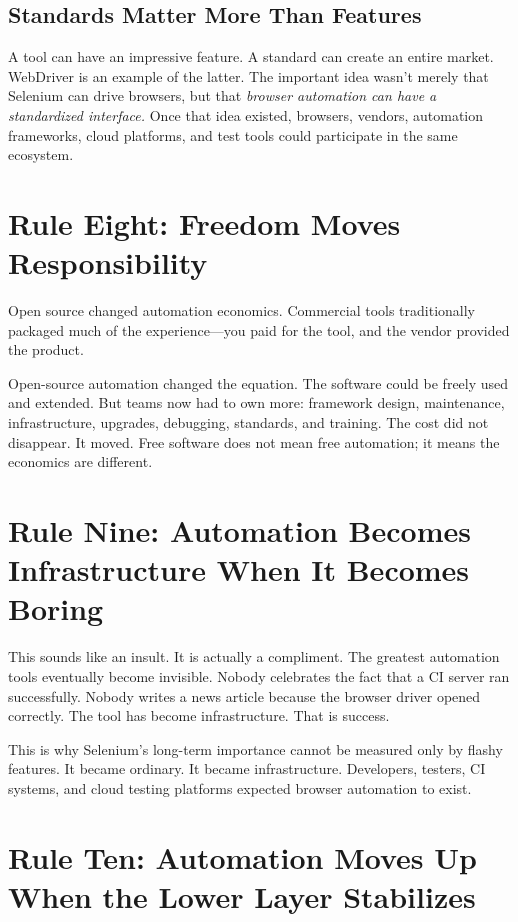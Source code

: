 \documentclass[11pt,twoside]{book}
\begin{document}
\subsection*{Standards Matter More Than Features}

A tool can have an impressive feature. A standard can create an entire market. WebDriver is an example of the latter. The important idea wasn't merely that Selenium can drive browsers, but that \emph{browser automation can have a standardized interface.} Once that idea existed, browsers, vendors, automation frameworks, cloud platforms, and test tools could participate in the same ecosystem.

\section*{Rule Eight: Freedom Moves Responsibility}

Open source changed automation economics. Commercial tools traditionally packaged much of the experience---you paid for the tool, and the vendor provided the product. 

Open-source automation changed the equation. The software could be freely used and extended. But teams now had to own more: framework design, maintenance, infrastructure, upgrades, debugging, standards, and training. The cost did not disappear. It moved. Free software does not mean free automation; it means the economics are different.

\section*{Rule Nine: Automation Becomes Infrastructure When It Becomes Boring}

This sounds like an insult. It is actually a compliment. The greatest automation tools eventually become invisible. Nobody celebrates the fact that a CI server ran successfully. Nobody writes a news article because the browser driver opened correctly. The tool has become infrastructure. That is success.

This is why Selenium's long-term importance cannot be measured only by flashy features. It became ordinary. It became infrastructure. Developers, testers, CI systems, and cloud testing platforms expected browser automation to exist.

\section*{Rule Ten: Automation Moves Up When the Lower Layer Stabilizes}
\end{document}
